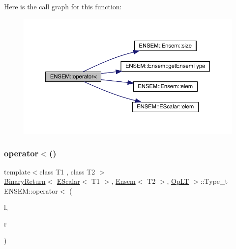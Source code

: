 Here is the call graph for this function\+:\nopagebreak
\begin{figure}[H]
\begin{center}
\leavevmode
\includegraphics[width=350pt]{d1/d9e/group__eensem_ga4f6f9b0944034ade90afab94b38db470_cgraph}
\end{center}
\end{figure}
\mbox{\label{group__eensem_ga32b783bbc9759bd7ae2cbaa1f757f87d}} 
\subsubsection{\texorpdfstring{operator$<$()}{operator<()}\hspace{0.1cm}{\footnotesize\ttfamily [3/3]}}
{\footnotesize\ttfamily template$<$class T1 , class T2 $>$ \\
\mbox{\hyperlink{structENSEM_1_1BinaryReturn}{Binary\+Return}}$<$ \mbox{\hyperlink{classENSEM_1_1EScalar}{E\+Scalar}}$<$ T1 $>$, \mbox{\hyperlink{classENSEM_1_1Ensem}{Ensem}}$<$ T2 $>$, \mbox{\hyperlink{structENSEM_1_1OpLT}{Op\+LT}} $>$\+::Type\+\_\+t E\+N\+S\+E\+M\+::operator$<$ (\begin{DoxyParamCaption}\item[{const \mbox{\hyperlink{classENSEM_1_1EScalar}{E\+Scalar}}$<$ T1 $>$ \&}]{l,  }\item[{const \mbox{\hyperlink{classENSEM_1_1Ensem}{Ensem}}$<$ T2 $>$ \&}]{r }\end{DoxyParamCaption})\hspace{0.3cm}{\ttfamily [inline]}}

